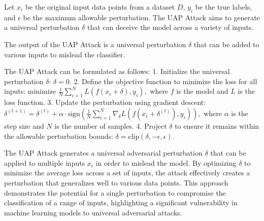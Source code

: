 Let \( x_i \) be the original input data points from a dataset \( D \), \( y_i \) be the true labels, and \( \epsilon \) be the maximum allowable perturbation. The UAP Attack aims to generate a universal perturbation \( \delta \) that can deceive the model across a variety of inputs.

The output of the UAP Attack is a universal perturbation \( \delta \) that can be added to various inputs to mislead the classifier.

The UAP Attack can be formulated as follows:
1. Initialize the universal perturbation \( \delta \):
   $
   \delta = 0.
   $
2. Define the objective function to minimize the loss for all inputs:
   $
   \text{minimize } \frac{1}{N} \sum_{i=1}^N L(f(x_i + \delta), y_i),
   $
   where \( f \) is the model and \( L \) is the loss function.
3. Update the perturbation using gradient descent:
   $
   \delta^{(t+1)} = \delta^{(t)} + \alpha \cdot \text{sign} \left( \frac{1}{N} \sum_{i=1}^N \nabla_{\delta} L(f(x_i + \delta^{(t)}), y_i) \right),
   $
   where \( \alpha \) is the step size and \( N \) is the number of samples.
4. Project \( \delta \) to ensure it remains within the allowable perturbation bounds:
   $
   \delta = \text{clip}(\delta, -\epsilon, \epsilon).
   $

The UAP Attack generates a universal adversarial perturbation \( \delta \) that can be applied to multiple inputs \( x_i \) in order to mislead the model. By optimizing \( \delta \) to minimize the average loss across a set of inputs, the attack effectively creates a perturbation that generalizes well to various data points. This approach demonstrates the potential for a single perturbation to compromise the classification of a range of inputs, highlighting a significant vulnerability in machine learning models to universal adversarial attacks.
